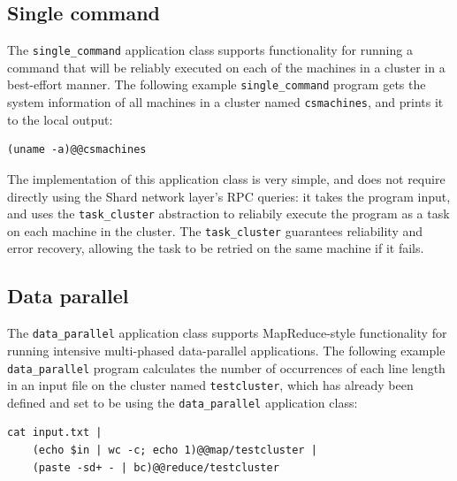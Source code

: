 \documentclass[twoside]{report}
\begin{document}
\subsection{Single command}

\begin{sloppypar}
  The \texttt{single\_command} application class supports functionality for running a command that will be reliably executed on each of the machines in a cluster in a best-effort manner. The following example \texttt{single\_command} program gets the system information of all machines in a cluster named \texttt{csmachines}, and prints it to the local output:
\end{sloppypar}

\begin{minipage}[c]{\textwidth-15pt}
  \begin{lstlisting}
(uname -a)@@csmachines 
\end{lstlisting}
  \smallskip
\end{minipage}

\begin{sloppypar}
  The implementation of this application class is very simple, and does not require directly using the Shard network layer's RPC queries: it takes the program input, and uses the \texttt{task\_cluster} abstraction to reliabily execute the program as a task on each machine in the cluster.
  The \texttt{task\_cluster} guarantees reliability and error recovery, allowing the task to be retried on the same machine if it fails.
\end{sloppypar}

\subsection{Data parallel}

The \texttt{data\_parallel} application class supports MapReduce-style functionality for running intensive multi-phased data-parallel applications.
The following example \texttt{data\_parallel} program calculates the number of occurrences of each line length in an input file on the cluster named \texttt{testcluster}, which has already been defined and set to be using the \texttt{data\_parallel} application class:

\begin{minipage}[c]{\textwidth-15pt}
  \begin{lstlisting}[language=shard]
cat input.txt |
    (echo $in | wc -c; echo 1)@@map/testcluster |
    (paste -sd+ - | bc)@@reduce/testcluster
\end{lstlisting}
  \smallskip
\end{minipage}
\end{document}

